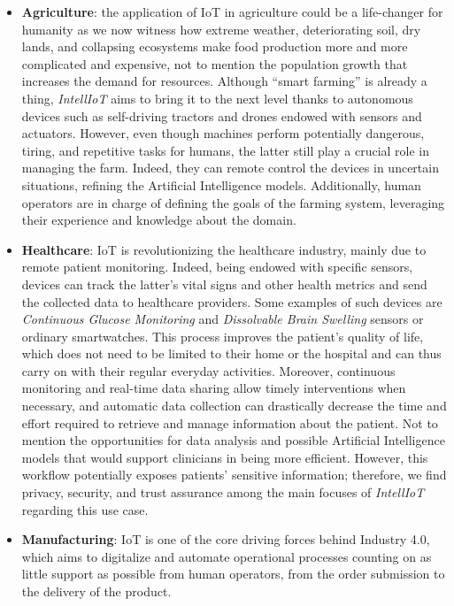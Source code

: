 \begin{itemize}
    \item \textbf{Agriculture}: the application of IoT in agriculture could be a life-changer for humanity as we now witness how extreme weather, deteriorating soil, dry lands, and collapsing ecosystems make food production more and more complicated and expensive, not to mention the population growth that increases the demand for resources.
    Although ``smart farming'' is already a thing, \textit{IntellIoT} aims to bring it to the next level thanks to autonomous devices such as self-driving tractors and drones endowed with sensors and actuators.
    However, even though machines perform potentially dangerous, tiring, and repetitive tasks for humans, the latter still play a crucial role in managing the farm.
    Indeed, they can remote control the devices in uncertain situations, refining the Artificial Intelligence models.
    Additionally, human operators are in charge of defining the goals of the farming system, leveraging their experience and knowledge about the domain.
    \item \textbf{Healthcare}: IoT is revolutionizing the healthcare industry, mainly due to remote patient monitoring.
    Indeed, being endowed with specific sensors, devices can track the latter's vital signs and other health metrics and send the collected data to healthcare providers.
    Some examples of such devices are \textit{Continuous Glucose Monitoring} \cite{facchinetti2013real} and \textit{Dissolvable Brain Swelling}\cite{kang2016bioresorbable} sensors or ordinary smartwatches.
    This process improves the patient's quality of life, which does not need to be limited to their home or the hospital and can thus carry on with their regular everyday activities.
    Moreover, continuous monitoring and real-time data sharing allow timely interventions when necessary, and automatic data collection can drastically decrease the time and effort required to retrieve and manage information about the patient.
    Not to mention the opportunities for data analysis and possible Artificial Intelligence models that would support clinicians in being more efficient.
    However, this workflow potentially exposes patients' sensitive information; therefore, we find privacy, security, and trust assurance among the main focuses of \textit{IntellIoT} regarding this use case.
    \newline
    \item \textbf{Manufacturing}: IoT is one of the core driving forces behind Industry 4.0, which aims to digitalize and automate operational processes counting on as little support as possible from human operators, from the order submission to the delivery of the product.

\end{itemize}
